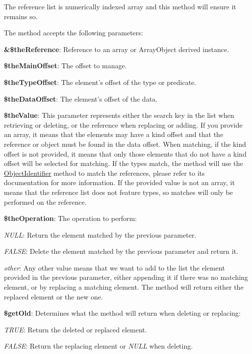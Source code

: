 The reference list is numerically indexed array and this method will ensure it remains so.

The method accepts the following parameters\-:


\begin{DoxyItemize}
\item {\bfseries \&\$the\-Reference}\-: Reference to an array or Array\-Object derived instance. 
\item {\bfseries \$the\-Main\-Offset}\-: The offset to manage. 
\item {\bfseries \$the\-Type\-Offset}\-: The element's offset of the type or predicate. 
\item {\bfseries \$the\-Data\-Offset}\-: The element's offset of the data. 
\item {\bfseries \$the\-Value}\-: This parameter represents either the search key in the list when retrieving or deleting, or the reference when replacing or adding. If you provide an array, it means that the elements may have a kind offset and that the reference or object must be found in the data offset. When matching, if the kind offset is not provided, it means that only those elements that do not have a kind offset will be selected for matching. If the types match, the method will use the \hyperlink{class_c_persistent_unit_object_ac7bfe8f6475e61abb2e9de9c112cbfe6}{Object\-Identifier} method to match the references, please refer to its documentation for more information. If the provided value is not an array, it means that the reference list does not feature types, so matches will only be performed on the reference. 
\item {\bfseries \$the\-Operation}\-: The operation to perform\-: 
\begin{DoxyItemize}
\item {\itshape N\-U\-L\-L}\-: Return the element matched by the previous parameter. 
\item {\itshape F\-A\-L\-S\-E}\-: Delete the element matched by the previous parameter and return it. 
\item {\itshape other}\-: Any other value means that we want to add to the list the element provided in the previous parameter, either appending it if there was no matching element, or by replacing a matching element. The method will return either the replaced element or the new one. 
\end{DoxyItemize}
\item {\bfseries \$get\-Old}\-: Determines what the method will return when deleting or replacing\-: 
\begin{DoxyItemize}
\item {\itshape T\-R\-U\-E}\-: Return the deleted or replaced element. 
\item {\itshape F\-A\-L\-S\-E}\-: Return the replacing element or {\itshape N\-U\-L\-L} when deleting. 
\end{DoxyItemize}
\end{DoxyItemize}

